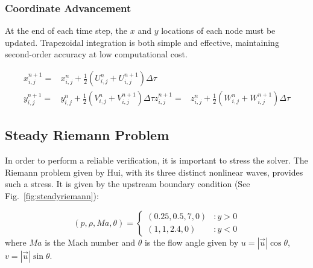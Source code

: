 \documentclass[12pt,letterpaper]{article}
\begin{document}
\subsubsection{Coordinate Advancement}

At the end of each time step, the $x$ and $y$ locations of each node must be updated. Trapezoidal integration is both simple and effective, maintaining second-order accuracy at low computational cost. 

\begin{align}
x_{i,j}^{n+1}=&x_{i,j}^{n}+\frac{1}{2}\left(U^n_{i,j}+U^{n+1}_{i,j}\right)\Delta\tau\\
y_{i,j}^{n+1}=&y_{i,j}^{n}+\frac{1}{2}\left(V^n_{i,j}+V^{n+1}_{i,j}\right)\Delta\tau
z_{i,j}^{n+1}=&z_{i,j}^{n}+\frac{1}{2}\left(W^n_{i,j}+W^{n+1}_{i,j}\right)\Delta\tau
\end{align}

\subsection{Steady Riemann Problem}
In order to perform a reliable verification, it is important to stress
the solver. The Riemann problem given by Hui\cite{hui99}, with its three distinct 
nonlinear waves, provides such a stress. It is given by the upstream
boundary condition (See Fig.~\ref{fig:steadyriemann}): 

\begin{equation}
\left(p,\rho,Ma,\theta\right)=\left\{
\begin{array}{lr}
\left(0.25,0.5,7,0\right) & :y>0\\
\left(1,1,2.4,0\right) & :y<0
\end{array}
\right.
\end{equation}
\noindent where $Ma$ is the Mach number and $\theta$ is the flow angle given by
$u=\left|\vec{u}\right|\cos{\theta}$,
$v=\left|\vec{u}\right|\sin{\theta}$.
\end{document}
